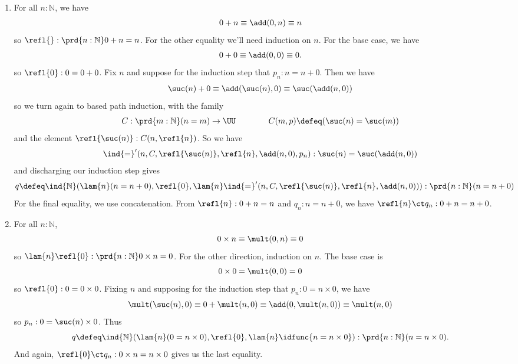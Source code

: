\begin{enumerate}
\item For all $n : \mathbb{N}$, we have
\begin{align*}
  0 + n \equiv \add(0, n) \equiv n
\end{align*}
so $\refl{}:\prd{n:\mathbb{N}}0+n = n$.  For the other equality
we'll need induction on $n$.  For the base case, we have
\begin{align*}
  0 + 0 \equiv \add(0, 0) \equiv 0.
\end{align*}
so $\refl{0} : 0 = 0 + 0$.
Fix $n$ and suppose for the induction step that $p_{n} : n = n+0$.  Then we have
\begin{align*}
  \suc(n) + 0 \equiv \add(\suc(n), 0) \equiv \suc(\add(n, 0))  
\end{align*}
so we turn again to based path induction, with the family
\[
  C : \prd{m:\mathbb{N}}(n = m) \to \UU
  \qquad\qquad
  C(m, p) \defeq (\suc(n) = \suc(m))
\]
and the element $\refl{\suc(n)} : C(n, \refl{n})$.  So we have
\[
  \ind{=}'(n, C, \refl{\suc(n)}, \refl{n}, \add(n, 0), p_{n}) 
  : 
  \suc(n) = \suc(\add(n, 0))
\]
and discharging our induction step gives
\[
  q \defeq \ind{\mathbb{N}}(\lam{n}(n = n+0), \refl{0}, 
    \lam{n}\ind{=}'(n, C, \refl{\suc(n)}, \refl{n}, \add(n, 0))
  )
  :
  \prd{n:\mathbb{N}} (n = n+0)
\]
For the final equality, we use concatenation.  From $\refl{n} : 0 + n = n$ and
$q_{n} : n = n + 0$, we have $\refl{n} \ct q_{n} : 0 + n = n + 0$.

\item For all $n : \mathbb{N}$,
\[
  0 \times n \equiv \mult(0, n) \equiv 0
\]
so $\lam{n}\refl{0} : \prd{n:\mathbb{N}}0 \times n = 0$.  For the other
direction, induction on $n$.  The base case is
\[
  0 \times 0 = \mult(0, 0) = 0
\]
so $\refl{0} : 0 = 0 \times 0$.  Fixing $n$ and supposing for the induction step that $p_{n} :
0 = n \times 0$, we have
\[
  \mult(\suc(n), 0) \equiv 0 + \mult(n, 0) \equiv \add(0, \mult(n, 0)) \equiv
  \mult(n, 0)
\]
so $p_{n} : 0 = \suc(n) \times 0$.  Thus
\[
  q 
  \defeq \ind{\mathbb{N}}(\lam{n}(0 = n \times 0), \refl{0}, \lam{n}\idfunc{n = n \times 0}) 
  : \prd{n : \mathbb{N}} (n = n \times 0).
\]
And again, $\refl{0} \ct q_{n} : 0 \times n = n \times 0$ gives us the last
equality.


\end{enumerate}
